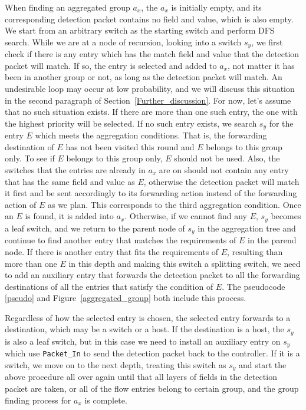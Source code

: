 When finding an aggregated group $a_x$, the $a_x$ is initially empty, and its corresponding detection packet contains no field and value, which is also empty. We start from an arbitrary switch as the starting switch and perform DFS search. While we are at a node of recursion, looking into a switch $s_y$, we first check if there is any entry which has the match field and value that the detection packet will match. If so, the entry is selected and added to $a_x$, not matter it has been in another group or not, as long as the detection packet will match. An undesirable loop may occur at low probability, and we will discuss this situation in the second paragraph of Section~\ref{Further_discussion}. For now, let's assume that no such situation exists. If there are more than one such entry, the one with the highest priority will be selected. If no such entry exists, we search $s_y$ for the entry $E$ which meets the aggregation conditions. That is, the forwarding destination of $E$ has not been visited this round and $E$ belongs to this group only. To see if $E$ belongs to this group only, $E$ should not be used. Also, the switches that the entries are already in $a_x$ are on should not contain any entry that has the same field and value as $E$, otherwise the detection packet will match it first and be sent accordingly to its forwarding action instead of the forwarding action of $E$ as we plan. This corresponds to the third aggregation condition. Once an $E$ is found, it is added into $a_x$. Otherwise, if we cannot find any $E$, $s_y$ becomes a leaf switch, and we return to the parent node of $s_y$ in the aggregation tree and continue to find another entry that matches the requirements of $E$ in the parend node. If there is another entry that fits the requirements of $E$, resulting than more than one $E$ in this depth and making this switch a splitting switch, we need to add an auxiliary entry that forwards the detection packet to all the forwarding destinations of all the entries that satisfy the condition of $E$. The pseudocode \ref{pseudo} and Figure~\ref{aggregated_group} both include this process.

Regardless of how the selected entry is chosen, the selected entry forwards to a destination, which may be a switch or a host. If the destination is a host, the $s_y$ is also a leaf switch, but in this case we need to install an auxiliary entry on $s_y$ which use \texttt{Packet\_In} to send the detection packet back to the controller. If it is a switch, we move on to the next depth, treating this switch as $s_y$ and start the above procedure all over again until that all layers of fields in the detection packet are taken, or all of the flow entries belong to certain group, and the group finding process for $a_x$ is complete.

